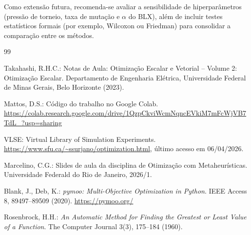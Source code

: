 \documentclass[runningheads]{llncs}
\begin{document}
Como extensão futura, recomenda-se avaliar a sensibilidade de hiperparâmetros (pressão de torneio, taxa de mutação e $\alpha$ do BLX), além de incluir testes estatísticos formais (por exemplo, Wilcoxon ou Friedman) para consolidar a comparação entre os métodos.

\begin{thebibliography}{99}

Takahashi, R.H.C.: Notas de Aula: Otimização Escalar e Vetorial -- Volume 2: Otimização Escalar.
Departamento de Engenharia Elétrica, Universidade Federal de Minas Gerais, Belo Horizonte (2023).

Mattos, D.S.: Código do trabalho no Google Colab.
\url{https://colab.research.google.com/drive/1QzpCkviWcmNqncEVkiM7mFcWjVB7TdL_?usp=sharing}

VLSE: Virtual Library of Simulation Experiments.
\url{https://www.sfu.ca/~ssurjano/optimization.html}, último acesso em 06/04/2026.

Marcelino, C.G.: Slides de aula da disciplina de Otimização com Metaheurísticas.
Universidade Federald do Rio de Janeiro,
2026/1.

Blank, J., Deb, K.: \textit{pymoo: Multi-Objective Optimization in Python}.
IEEE Access 8, 89497--89509 (2020).
\url{https://pymoo.org/}

Rosenbrock, H.H.: \textit{An Automatic Method for Finding the Greatest or Least Value of a Function}.
The Computer Journal 3(3), 175--184 (1960).

\end{thebibliography}
\end{document}
